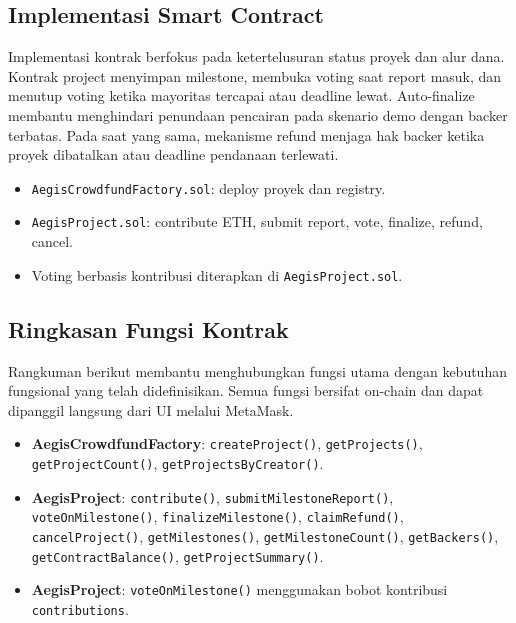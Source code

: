 \documentclass[12pt]{article}
\begin{document}
\subsection{Implementasi Smart Contract}
Implementasi kontrak berfokus pada ketertelusuran status proyek dan alur dana. Kontrak project menyimpan milestone, membuka voting saat report masuk, dan menutup voting ketika mayoritas tercapai atau deadline lewat. Auto-finalize membantu menghindari penundaan pencairan pada skenario demo dengan backer terbatas. Pada saat yang sama, mekanisme refund menjaga hak backer ketika proyek dibatalkan atau deadline pendanaan terlewati.
\begin{itemize}[leftmargin=1.2em]
  \item \texttt{AegisCrowdfundFactory.sol}: deploy proyek dan registry.
  \item \texttt{AegisProject.sol}: contribute ETH, submit report, vote, finalize, refund, cancel.
  \item Voting berbasis kontribusi diterapkan di \texttt{AegisProject.sol}.
\end{itemize}

\subsection{Ringkasan Fungsi Kontrak}
Rangkuman berikut membantu menghubungkan fungsi utama dengan kebutuhan fungsional yang telah didefinisikan. Semua fungsi bersifat on-chain dan dapat dipanggil langsung dari UI melalui MetaMask.
\begin{itemize}[leftmargin=1.2em]
  \item \textbf{AegisCrowdfundFactory}: \texttt{createProject()}, \texttt{getProjects()}, \texttt{getProjectCount()}, \texttt{getProjectsByCreator()}.
  \item \textbf{AegisProject}: \texttt{contribute()}, \texttt{submitMilestoneReport()}, \texttt{voteOnMilestone()}, \texttt{finalizeMilestone()}, \texttt{claimRefund()}, \texttt{cancelProject()}, \texttt{getMilestones()}, \texttt{getMilestoneCount()}, \texttt{getBackers()}, \texttt{getContractBalance()}, \texttt{getProjectSummary()}.
  \item \textbf{AegisProject}: \texttt{voteOnMilestone()} menggunakan bobot kontribusi \texttt{contributions}.
\end{itemize}
\end{document}
